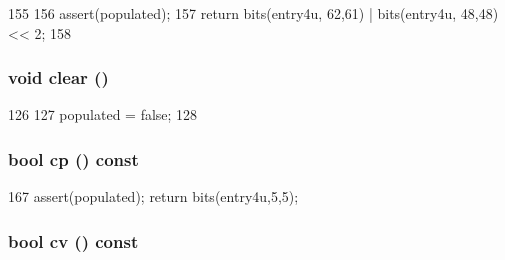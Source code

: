 \begin{DoxyCode}
155     {
156         assert(populated);
157         return bits(entry4u, 62,61) | bits(entry4u, 48,48) << 2;
158     }
\end{DoxyCode}
\hypertarget{classSparcISA_1_1PageTableEntry_ac8bb3912a3ce86b15842e79d0b421204}{
\subsubsection[{clear}]{\setlength{\rightskip}{0pt plus 5cm}void clear ()}}
\label{classSparcISA_1_1PageTableEntry_ac8bb3912a3ce86b15842e79d0b421204}



\begin{DoxyCode}
126     {
127         populated = false;
128     }
\end{DoxyCode}
\hypertarget{classSparcISA_1_1PageTableEntry_aa54ec88247ae312c0622dc2e402bb99b}{
\subsubsection[{cp}]{\setlength{\rightskip}{0pt plus 5cm}bool cp () const}}
\label{classSparcISA_1_1PageTableEntry_aa54ec88247ae312c0622dc2e402bb99b}



\begin{DoxyCode}
167 { assert(populated); return bits(entry4u,5,5); }
\end{DoxyCode}
\hypertarget{classSparcISA_1_1PageTableEntry_a92853352805a625ea371d16aa99235e3}{
\subsubsection[{cv}]{\setlength{\rightskip}{0pt plus 5cm}bool cv () const}}
\label{classSparcISA_1_1PageTableEntry_a92853352805a625ea371d16aa99235e3}



